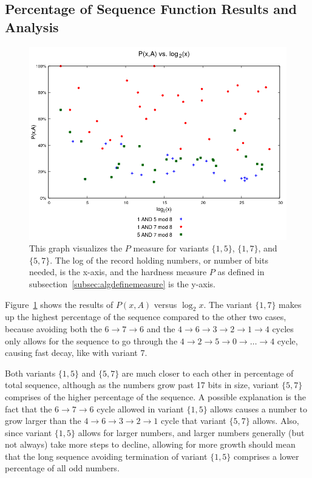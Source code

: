 \subsection{Percentage of Sequence Function Results and Analysis} \label{subsubsec:algmulpercentage}
\begin{figure}
    \centering
    \includegraphics[scale=0.6]{ModAvoidanceAnalysisPics/P_vs_log_multi_base.png}
    \caption{This graph visualizes the $P$ measure for variants $\{1,5\}$, $\{1,7\}$, and $\{5,7\}$. The log of the record holding numbers, or number of bits needed, is the x-axis, and the hardness measure $P$ as defined in subsection~\ref{subsec:algdefinemeasure} is the y-axis.}
    \label{fig:p_multi_vslog}
\end{figure}
Figure~\ref{fig:p_multi_vslog} shows the results of $P(x,A)$ versus $\log_2{x}$. The variant $\{1,7\}$ makes up the highest percentage of the sequence compared to the other two cases, because avoiding both the $6 \rightarrow 7 \rightarrow 6$ and the $4 \rightarrow 6 \rightarrow 3 \rightarrow 2 \rightarrow 1 \rightarrow 4$ cycles only allows for the sequence to go through the $4  \rightarrow 2 \rightarrow 5 \rightarrow 0 \rightarrow \ldots \rightarrow 4$ cycle, causing fast decay, like with variant 7. \par
Both variants $\{1,5\}$ and $\{5,7\}$ are much closer to each other in percentage of total sequence, although as the numbers grow past 17 bits in size, variant $\{5,7\}$ comprises of the higher percentage of the sequence. A possible explanation is the fact that the $6 \rightarrow 7 \rightarrow 6$ cycle allowed in variant $\{1,5\}$ allows causes a number to grow larger than the $4 \rightarrow 6 \rightarrow 3 \rightarrow 2 \rightarrow 1$ cycle that variant $\{5,7\}$ allows. Also, since variant $\{1,5\}$ allows for larger numbers, and larger numbers generally (but not always) take more steps to decline, allowing for more growth should mean that the long sequence avoiding termination of variant $\{1,5\}$ comprises a lower percentage of all odd numbers.
